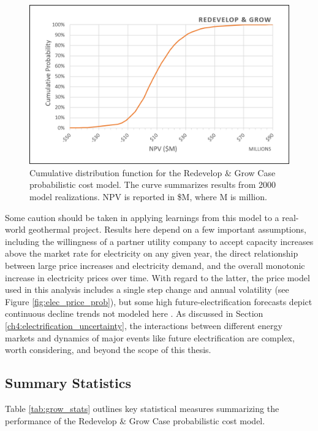 \begin{figure}[!htp]
\centering
\includegraphics[width=.85\textwidth]{templates/images/Figure-Grow_Case_CDF.png}
\caption[Redevelop \& Grow Case CDF]{Cumulative distribution function for the Redevelop \& Grow Case probabilistic cost model. The curve summarizes results from 2000 model realizations. NPV is reported in \$M, where M is million.}
\label{fig:grow_case_cdf}
\end{figure}

Some caution should be taken in applying learnings from this model to a real-world geothermal project. Results here depend on a few important assumptions, including the willingness of a partner utility company to accept capacity increases above the market rate for electricity on any given year, the direct relationship between large price increases and electricity demand, and the overall monotonic increase in electricity prices over time. With regard to the latter, the price model used in this analysis includes a single step change and annual volatility (see Figure \ref{fig:elec_price_prob}), but some high future-electrification forecasts depict continuous decline trends not modeled here \citep{murphy_electrification_2021}. As discussed in Section \ref{ch4:electrification_uncertainty}, the interactions between different energy markets and dynamics of major events like future electrification are complex, worth considering, and beyond the scope of this thesis. 

\subsection{Summary Statistics}\label{ch6:grow_stats}
Table \ref{tab:grow_stats} outlines key statistical measures summarizing the performance of the Redevelop \& Grow Case probabilistic cost model.

